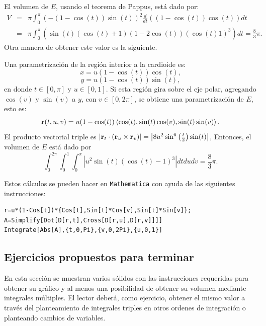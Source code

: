 El volumen de $E$, usando el teorema de Pappus, está dado por:
%
{\small
\begin{eqnarray*}
V&=&\pi \int_{0}^{\pi }\left(- \left( 1-\cos (t) \right) \sin
(t) \right) ^{2}\frac{d}{dt}\left( \left( 1-\cos (t)
\right) \cos (t) \right) dt \\
&=& \pi \int_{0}^{\pi }\left( \sin (t) \left( \cos (t)
+1\right) \left( 1-2\cos (t) \right) \left( \cos (t)
1\right) ^{3} \right) dt = \frac{8}{3}\pi.
\end{eqnarray*}
}
%
Otra manera de obtener este valor es la siguiente.

%
Una parametrización de la región interior a la cardioide es:
\[x=u\left( 1-\cos (t) \right) \cos (t),\]
%
\[y=u\left( 1-\cos (t) \right) \sin (t),\]
en donde $t\in [0,\pi]$ y $u\in [0,1]$.
Si esta región gira sobre el eje polar, agregando $\cos(v)$ y $\sin(v)$ a $y$, con $v \in [0,2\pi]$, se obtiene una parametrización de $E$, esto es:
%
\[{\bf r}(t,u,v)=u(1-\cos (t))\left\langle \cos (t) ,\sin (t) \cos (v) ,\sin(t) \sin (v) \right \rangle.\]
%
El producto vectorial triple es
$\left| {\bf r}_{t}\cdot \left( {\bf r}_{u}\times {\bf r}_{v}\right) \right| = \left|
8 u^2 \sin ^6\left(\frac{t}{2}\right) \sin (t)\right| $,
Entonces, el volumen de $E$ está dado por
%
\[\int_{0}^{2\pi }\int_{0}^{1}\int_{0}^{\pi }\left| u^{2}\sin (t)
\left( \cos (t) -1\right) ^{3}\right| dtdudv= \frac{8}{3}\pi.\]
%

Estos cálculos se pueden hacer en \verb"Mathematica" con ayuda de las siguientes instrucciones:

\begin{tcolorbox}[title=\bf Instrucción \verb"Mathematica"]\begin{Verbatim}[formatcom=\letraverbatim]
r=u*(1-Cos[t])*{Cos[t],Sin[t]*Cos[v],Sin[t]*Sin[v]};
A=Simplify[Dot[D[r,t],Cross[D[r,u],D[r,v]]]]
Integrate[Abs[A],{t,0,Pi},{v,0,2Pi},{u,0,1}]
\end{Verbatim}
\end{tcolorbox}


\subsection{Ejercicios propuestos para terminar}
En esta sección se muestran varios sólidos con las instrucciones requeridas para obtener su gráfico y
al menos una posibilidad de obtener su volumen mediante integrales múltiples.
El lector deberá, como ejercicio, obtener el mismo valor a través del planteamiento de integrales triples en otros
ordenes de integración o planteando cambios de variables.

